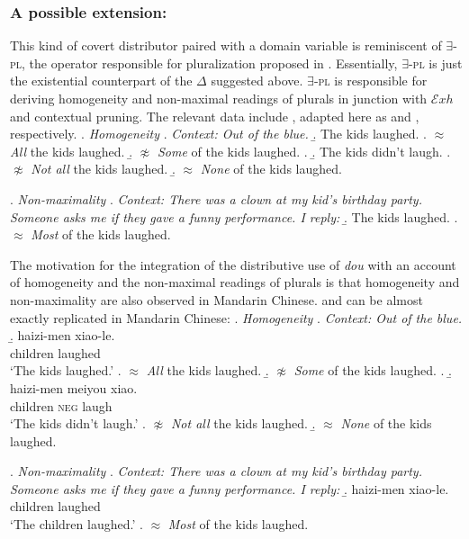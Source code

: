 \documentclass[12pt]{article}
\newcommand{\Exh}{\ensuremath{\mathcal{E}\mathit{xh}}}
\begin{document}
\subsubsection[A possible extension: Bar-Lev (2021)]{A possible extension: \citet{bar-levImplicatureAccountHomogeneity2021}}
\label{ssub:a_possible_extension_bar_levimplicatureaccounthomogeneity2021}
This kind of covert distributor paired with a domain variable is reminiscent of \(\exists\)-\textsc{pl}, the operator responsible for pluralization proposed in \citet{bar-levImplicatureAccountHomogeneity2021}.
Essentially, \(\exists\)-\textsc{pl} is just the existential counterpart of the \(\Delta\) suggested above.
\(\exists\)-\textsc{pl} is responsible for deriving homogeneity and non-maximal readings of plurals in junction with {\Exh} and contextual pruning.
The relevant data include \citet[(1) and (3)]{bar-levImplicatureAccountHomogeneity2021}, adapted here as \Next and \NNext, respectively.
\ex. \emph{Homogeneity}
\a. \emph{Context: Out of the blue.} 
\b. The kids laughed.
\a. \(≈\) \emph{All} the kids laughed.
\b. \(\not\approx\) \emph{Some} of the kids laughed.
\z.
\b. The kids didn't laugh.
\a. \(\not\approx\) \emph{Not all} the kids laughed.
\b. \(\approx\) \emph{None} of the kids laughed.

\ex. \emph{Non-maximality}
\a. \emph{Context: There was a clown at my kid's birthday party. Someone asks me if they gave a funny performance. I reply:}
\b. The kids laughed.
\a. \(\approx\) \emph{Most} of the kids laughed.

The motivation for the integration of the distributive use of \emph{dou} with an account of homogeneity and the non-maximal readings of plurals is that homogeneity and non-maximality are also observed in Mandarin Chinese.
\Last and \LLast can be almost exactly replicated in Mandarin Chinese:
\ex. \emph{Homogeneity}
\a. \emph{Context: Out of the blue.} 
\b. \gll 
haizi-men xiao-le. \\
children laughed \\
\glt `The kids laughed.'
\a. \(≈\) \emph{All} the kids laughed.
\b. \(\not\approx\) \emph{Some} of the kids laughed.
\z.
\b. \gll 
haizi-men meiyou xiao. \\
children \textsc{neg} laugh \\
\glt `The kids didn't laugh.'
\a. \(\not\approx\) \emph{Not all} the kids laughed.
\b. \(\approx\) \emph{None} of the kids laughed.

\ex. \emph{Non-maximality}
\a. \emph{Context: There was a clown at my kid's birthday party. Someone asks me if they gave a funny performance. I reply:}
\b. \gll 
haizi-men xiao-le. \\
children laughed \\
\glt `The children laughed.'
\a. \(\approx\) \emph{Most} of the kids laughed.
\end{document}
